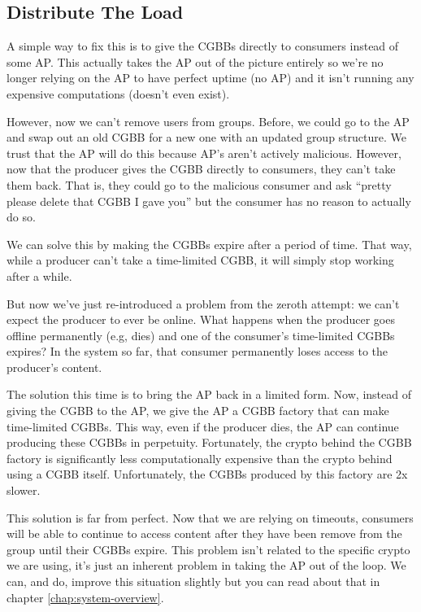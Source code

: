 \documentclass[pdftex,12pt,a4papaer,twoside,notitlepage]{report}
\begin{document}
\subsection{Distribute The Load}

A simple way to fix this is to give the CGBBs directly to consumers instead of
some AP. This actually takes the AP out of the picture entirely so we're no
longer relying on the AP to have perfect uptime (no AP) and it isn't running any
expensive computations (doesn't even exist).

However, now we can't remove users from groups. Before, we could go to the AP
and swap out an old CGBB for a new one with an updated group structure. We trust
that the AP will do this because AP's aren't actively malicious. However, now
that the producer gives the CGBB directly to consumers, they can't take them
back. That is, they could go to the malicious consumer and ask ``pretty please
delete that CGBB I gave you'' but the consumer has no reason to actually do so.

We can solve this by making the CGBBs expire after a period of time. That way,
while a producer can't take a time-limited CGBB, it will simply stop working
after a while.

But now we've just re-introduced a problem from the zeroth attempt: we can't
expect the producer to ever be online. What happens when the producer goes
offline permanently (e.g, dies) and one of the consumer's time-limited CGBBs
expires? In the system so far, that consumer permanently loses access to the
producer's content.

The solution this time is to bring the AP back in a limited form. Now, instead
of giving the CGBB to the AP, we give the AP a CGBB factory that can make
time-limited CGBBs. This way, even if the producer dies, the AP can continue
producing these CGBBs in perpetuity. Fortunately, the crypto behind the CGBB
factory is significantly less computationally expensive than the crypto behind
using a CGBB itself. Unfortunately, the CGBBs produced by this factory are 2x
slower.

This solution is far from perfect. Now that we are relying on timeouts,
consumers will be able to continue to access content after they have been remove
from the group until their CGBBs expire. This problem isn't related to the
specific crypto we are using, it's just an inherent problem in taking the AP out
of the loop. We can, and do, improve this situation slightly but you can read
about that in chapter \ref{chap:system-overview}.
\end{document}
